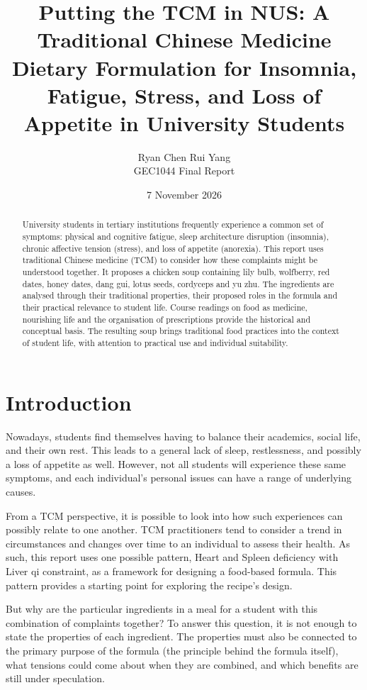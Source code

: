 \documentclass[12pt,a4paper]{article}
\title{Putting the TCM in NUS: A Traditional Chinese Medicine Dietary Formulation for Insomnia, Fatigue, Stress, and Loss of Appetite in University Students}
\author{Ryan Chen Rui Yang\\GEC1044 Final Report}
\date{7 November 2026}
\begin{document}
\maketitle

\begin{abstract}
University students in tertiary institutions frequently experience a common set of symptoms: physical and cognitive fatigue, sleep architecture disruption (insomnia), chronic affective tension (stress), and loss of appetite (anorexia). This report uses traditional Chinese medicine (TCM) to consider how these complaints might be understood together. It proposes a chicken soup containing lily bulb, wolfberry, red dates, honey dates, dang gui, lotus seeds, cordyceps and yu zhu. The ingredients are analysed through their traditional properties, their proposed roles in the formula and their practical relevance to student life. Course readings on food as medicine, nourishing life and the organisation of prescriptions provide the historical and conceptual basis. The resulting soup brings traditional food practices into the context of student life, with attention to practical use and individual suitability.
\end{abstract}
\pagebreak

\tableofcontents
\clearpage

\section{Introduction}
Nowadays, students find themselves having to balance their academics, social life, and their own rest. This leads to a general lack of sleep, restlessness, and possibly a loss of appetite as well. However, not all students will experience these same symptoms, and each individual's personal issues can have a range of underlying causes.

From a TCM perspective, it is possible to look into how such experiences can possibly relate to one another. TCM practitioners tend to consider a trend in circumstances and changes over time to an individual to assess their health. As such, this report uses one possible pattern, Heart and Spleen deficiency with Liver qi constraint, as a framework for designing a food-based formula. This pattern provides a starting point for exploring the recipe's design.

But why are the particular ingredients in a meal for a student with this combination of complaints together? To answer this question, it is not enough to state the properties of each ingredient. The properties must also be connected to the primary purpose of the formula (the principle behind the formula itself), what tensions could come about when they are combined, and which benefits are still under speculation.
\end{document}
